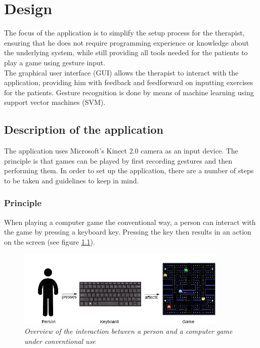 \chapter{Design}

The focus of the application is to simplify the setup process for the therapist, ensuring that he does not require programming experience or knowledge about the underlying system, while still providing all tools needed for the patients to play a game using gesture input.\\

The graphical user interface (GUI) allows the therapist to interact with the application, providing him with feedback and feedforward on inputting exercises for the patients. Gesture recognition is done by means of machine learning using support vector machines (SVM).


\section{Description of the application}

The application uses Microsoft's Kinect 2.0 camera as an input device. The principle is that games can be played by first recording gestures and then performing them. In order to set up the application, there are a number of steps to be taken and guidelines to keep in mind.


\subsection{Principle}

When playing a computer game the conventional way, a person can interact with the game by pressing a keyboard key. Pressing the key then results in an action on the screen (see figure \ref{fig: overview_basic_interaction}).\\

\begin{figure}[H]
\begin{center}
\includegraphics[width=10cm]{Concept1.png}
\caption{\emph{Overview of the interaction between a person and a computer game under conventional use}}
\label{fig: overview_basic_interaction}
\end{center}
\end{figure}

